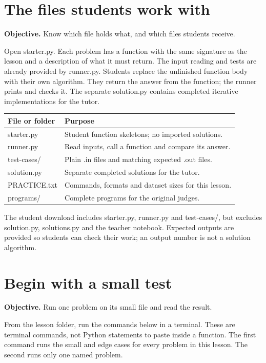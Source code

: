 \documentclass[11pt,a4paper,oneside]{report}
\newcommand{\sectiongoal}[1]{\par{\color{quiet}\textbf{Objective.} #1}\par\smallskip}
\newcommand{\nextpointer}[1]{\par\smallskip{\color{quiet}\textbf{Next.} #1}\par}
\begin{document}
\section{The files students work with}
\sectiongoal{Know which file holds what, and which files students receive.}
Open starter.py. Each problem has a function with the same signature as the lesson and a description of what it must return. The input reading and tests are already provided by runner.py. Students replace the unfinished function body with their own algorithm. They return the answer from the function; the runner prints and checks it. The separate solution.py contains completed iterative implementations for the tutor.

\par\medskip\begingroup\small\setlength{\tabcolsep}{4pt}\renewcommand{\arraystretch}{1.3}\begin{tabularx}{\linewidth}{>{\raggedright\arraybackslash}p{30mm}>{\raggedright\arraybackslash}X}\toprule\textbf{File or folder} & \textbf{Purpose}\\\midrule
{}starter.py & Student function skeletons; no imported solutions.\\
{}runner.py & Read inputs, call a function and compare its answer.\\
{}test-cases/ & Plain .in files and matching expected .out files.\\
{}solution.py & Separate completed solutions for the tutor.\\
{}PRACTICE.txt & Commands, formats and dataset sizes for this lesson.\\
{}programs/ & Complete programs for the original judges.\\
\bottomrule\end{tabularx}\endgroup\par\medskip
The student download includes starter.py, runner.py and test-cases/, but excludes solution.py, solutions.py and the teacher notebook. Expected outputs are provided so students can check their work; an output number is not a solution algorithm.

\nextpointer{Run the small tests first.}
\section{Begin with a small test}
\sectiongoal{Run one problem on its small file and read the result.}
From the lesson folder, run the commands below in a terminal. These are terminal commands, not Python statements to paste inside a function. The first command runs the small and edge cases for every problem in this lesson. The second runs only one named problem.
\end{document}
